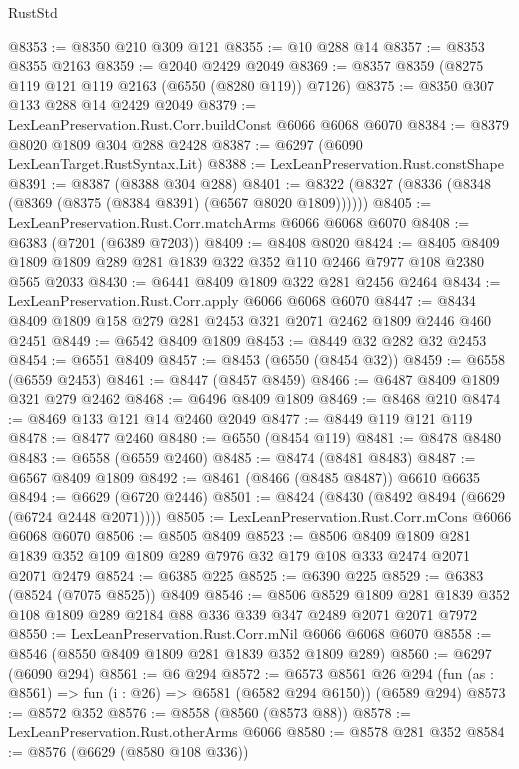 \begin{lexlean}{RustStd}
\begin{coremodule}
@8353 := @8350 @210 @309 @121
@8355 := @10 @288 @14
@8357 := @8353 @8355 @2163
@8359 := @2040 @2429 @2049
@8369 := @8357 @8359 (@8275 @119 @121 @119 @2163 (@6550 (@8280 @119)) @7126)
@8375 := @8350 @307 @133 @288 @14 @2429 @2049
@8379 := LexLeanPreservation.Rust.Corr.buildConst @6066 @6068 @6070
@8384 := @8379 @8020 @1809 @304 @288 @2428
@8387 := @6297 (@6090 LexLeanTarget.RustSyntax.Lit)
@8388 := LexLeanPreservation.Rust.constShape
@8391 := @8387 (@8388 @304 @288)
@8401 := @8322 (@8327 (@8336 (@8348 (@8369 (@8375 (@8384 @8391) (@6567 @8020 @1809))))))
@8405 := LexLeanPreservation.Rust.Corr.matchArms @6066 @6068 @6070
@8408 := @6383 (@7201 (@6389 @7203))
@8409 := @8408 @8020
@8424 := @8405 @8409 @1809 @1809 @289 @281 @1839 @322 @352 @110 @2466 @7977 @108 @2380 @565 @2033
@8430 := @6441 @8409 @1809 @322 @281 @2456 @2464
@8434 := LexLeanPreservation.Rust.Corr.apply @6066 @6068 @6070
@8447 := @8434 @8409 @1809 @158 @279 @281 @2453 @321 @2071 @2462 @1809 @2446 @460 @2451
@8449 := @6542 @8409 @1809
@8453 := @8449 @32 @282 @32 @2453
@8454 := @6551 @8409
@8457 := @8453 (@6550 (@8454 @32))
@8459 := @6558 (@6559 @2453)
@8461 := @8447 (@8457 @8459)
@8466 := @6487 @8409 @1809 @321 @279 @2462
@8468 := @6496 @8409 @1809
@8469 := @8468 @210
@8474 := @8469 @133 @121 @14 @2460 @2049
@8477 := @8449 @119 @121 @119
@8478 := @8477 @2460
@8480 := @6550 (@8454 @119)
@8481 := @8478 @8480
@8483 := @6558 (@6559 @2460)
@8485 := @8474 (@8481 @8483)
@8487 := @6567 @8409 @1809
@8492 := @8461 (@8466 (@8485 @8487)) @6610 @6635
@8494 := @6629 (@6720 @2446)
@8501 := @8424 (@8430 (@8492 @8494 (@6629 (@6724 @2448 @2071))))
@8505 := LexLeanPreservation.Rust.Corr.mCons @6066 @6068 @6070
@8506 := @8505 @8409
@8523 := @8506
    @8409
    @1809
    @281
    @1839
    @352
    @109
    @1809
    @289
    @7976
    @32
    @179
    @108
    @333
    @2474
    @2071
    @2071
    @2479
@8524 := @6385 @225
@8525 := @6390 @225
@8529 := @6383 (@8524 (@7075 @8525)) @8409
@8546 := @8506
    @8529
    @1809
    @281
    @1839
    @352
    @108
    @1809
    @289
    @2184
    @88
    @336
    @339
    @347
    @2489
    @2071
    @2071
    @7972
@8550 := LexLeanPreservation.Rust.Corr.mNil @6066 @6068 @6070
@8558 := @8546 (@8550 @8409 @1809 @281 @1839 @352 @1809 @289)
@8560 := @6297 (@6090 @294)
@8561 := @6 @294
@8572 := @6573
    @8561
    @26
    @294
    (fun (as : @8561) => fun (i : @26) => @6581 (@6582 @294 @6150))
    (@6589 @294)
@8573 := @8572 @352
@8576 := @8558 (@8560 (@8573 @88))
@8578 := LexLeanPreservation.Rust.otherArms @6066
@8580 := @8578 @281 @352
@8584 := @8576 (@6629 (@8580 @108 @336))

\end{coremodule}
\end{lexlean}
